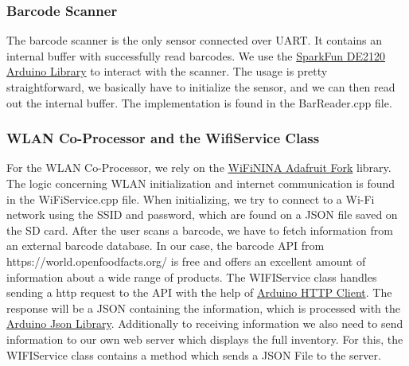 \documentclass{article}
\begin{document}
\subsubsection{Barcode Scanner}
The barcode scanner is the only sensor connected over UART. It contains an internal buffer with successfully read barcodes.
We use the \href{https://github.com/sparkfun/SparkFun_DE2120_Arduino_Library}{SparkFun DE2120 Arduino Library} to interact with the scanner.
The usage is pretty straightforward, we basically have to initialize the sensor, and we can then read out the internal buffer.
The implementation is found in the BarReader.cpp file.
\subsubsection{WLAN Co-Processor and the WifiService Class}
For the WLAN Co-Processor, we rely on the \href{https://github.com/adafruit/WiFiNINA}{WiFiNINA Adafruit Fork} library.
The logic concerning WLAN initialization and internet communication is found in the WiFiService.cpp file.
When initializing, we try to connect to a Wi-Fi network using the SSID and password, which are found on a JSON file saved on the SD card.
After the user scans a barcode, we have to fetch information from an external barcode database. In our case, the barcode API from https://world.openfoodfacts.org/ is free and offers an excellent amount of information about a wide range of products.
The WIFIService class handles sending a http request to the API with the help of \href{https://github.com/arduino-libraries/ArduinoHttpClient}{Arduino HTTP Client}.
The response will be a JSON containing the information, which is processed with the \href{https://github.com/bblanchon/ArduinoJson}{Arduino Json Library}.
Additionally to receiving information we also need to send information to our own web server which displays the full inventory. For this, the WIFIService class contains a method which sends a JSON File to the server.
\end{document}
